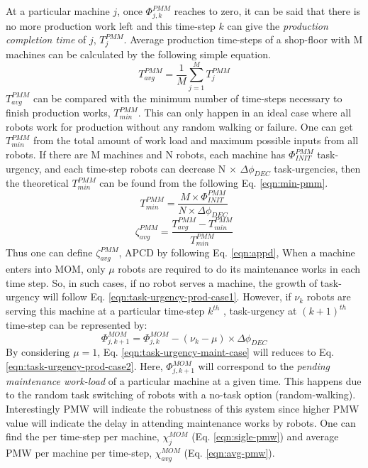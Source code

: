 At a particular machine $j$, once $\Phi_{j, k}^{PMM}$ reaches to zero, it can be said that there is no more production work left and this time-step $k$ can give the {\em production completion time} of $j$, $T_{j}^{PMM}$. Average production time-steps of a shop-floor with M machines can be calculated by the following simple equation.
\begin{equation}
T_{avg}^{PMM} = \frac{1}{M} \sum_{j=1}^{M} T_{j}^{PMM} 
\label{eqn:avg-pmm}
\end{equation}
$T_{avg}^{PMM}$ can be compared with the minimum number of time-steps necessary to finish production works, $T_{min}^{PMM}$. This can only happen in an ideal case where all robots work for production without any random walking or failure. One can get $T_{min}^{PMM}$ from the total amount of work load and maximum possible inputs from all robots. If there are M machines and N robots, each machine has $\Phi_{INIT}^{PMM}$ task-urgency, and each time-step robots can decrease N $\times$ $\Delta \phi_{DEC}$ task-urgencies, then the theoretical $T_{min}^{PMM}$ can be found from the following Eq. \ref{eqn:min-pmm}.
%
\begin{equation}
T_{min}^{PMM} = \frac{M \times \Phi_{INIT}^{PMM}}{N \times \Delta \phi_{DEC}} 
\label{eqn:min-pmm}
\end{equation}
\begin{equation}
\zeta_{avg}^{PMM} = \frac{T_{avg}^{PMM} - T_{min}^{PMM}}{T_{min}^{PMM}} 
\label{eqn:appd}
\end{equation}
Thus one can define $\zeta_{avg}^{PMM}$, \acf{APCD} by following Eq. \ref{eqn:appd},
When a machine enters into MOM, only $\mu$ robots are required to do its maintenance works in each time step. So, in such cases, if no robot serves a machine, the growth of task-urgency will follow Eq. \ref{eqn:task-urgency-prod-case1}. However, if $\nu_{k}$ robots are serving this machine at a particular time-step $k^{th}$ , task-urgency at $(k+1)^{th}$ time-step can be represented by:
\begin{equation}
\Phi_{j, k+1}^{MOM} = \Phi_{j, k}^{MOM}- (\nu_{k} - \mu) \times \Delta \phi_{DEC}
\label{eqn:task-urgency-maint-case}
\end{equation}
By considering $\mu = 1$, Eq. \ref{eqn:task-urgency-maint-case} will reduces to Eq. \ref{eqn:task-urgency-prod-case2}. Here, $\Phi_{j, k+1}^{MOM}$ will correspond to the {\em pending maintenance work-load} of a particular machine at a given time. This happens due to the random task switching of robots with a no-task option (random-walking). Interestingly PMW will indicate the robustness of this system since higher PMW value will indicate the delay in attending maintenance works by robots. One can find the  per time-step per machine, $\chi_{j}^{MOM}$ (Eq. \ref{eqn:sigle-pmw}) and average PMW per machine per time-step, $\chi_{avg}^{MOM}$ (Eq. \ref{eqn:avg-pmw}).
